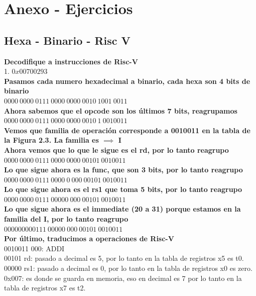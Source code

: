 \documentclass[10pt,a4paper]{article}
\begin{document}
\section*{Anexo - Ejercicios}
\subsection*{Hexa - Binario - Risc V}
\textbf{Decodifique a instrucciones de Risc-V} \\
1. $0x00700293$ \\ 

\textbf{Pasamos cada numero hexadecimal a binario, cada hexa son 4 bits de binario} \\ 
$0000 \ 0000 \ 0111 \ 0000 \ 0000 \ 0010 \ 1001 \ 0011$ \\

\textbf{Ahora sabemos que el opcode son los últimos 7 bits, reagrupamos} \\ 
$0000 \ 0000 \ 0111 \ 0000 \ 0000 \ 0010 \ 1 \ 0010011$ \\

\textbf{Vemos que familia de operación corresponde a 0010011 en la tabla de la Figura 2.3. La familia es $ \implies $ I} \\
\textbf{Ahora vemos que lo que le sigue es el rd, por lo tanto reagrupo} \\
$0000 \ 0000 \ 0111 \ 0000 \ 0000 \ 00101 \ 0010011$ \\

\textbf{Lo que sigue ahora es la func, que son 3 bits, por lo tanto reagrupo} \\
$0000 \ 0000 \ 0111 \ 0000 \ 0 \ 000 \ 00101 \ 0010011$ \\

\textbf{Lo que sigue ahora es el rs1 que toma 5 bits, por lo tanto reagrupo} \\ 
$0000 \ 0000 \ 0111 \ 00000 \ 000 \ 00101 \ 0010011$ \\ 

\textbf{Lo que sigue ahora es el immediate (20 a 31) porque estamos en la familia del I, por lo tanto reagrupo} \\ 
$0000 0000 0111 \ 00000 \ 000 \ 00101 \ 0010011$ \\

\textbf{Por último, traducimos a operaciones de Risc-V} \\ 
0010011 000: ADDI  \\ 
00101 rd: pasado a decimal es 5, por lo tanto en la tabla de registros x5 es t0. \\
00000 rs1: pasado a decimal es 0, por lo tanto en la tabla de registros x0 es zero. \\
0x007: es donde se guarda en memoria, eso en decimal es 7 por lo tanto en la tabla de registros x7 es t2. \\ 
\end{document}
